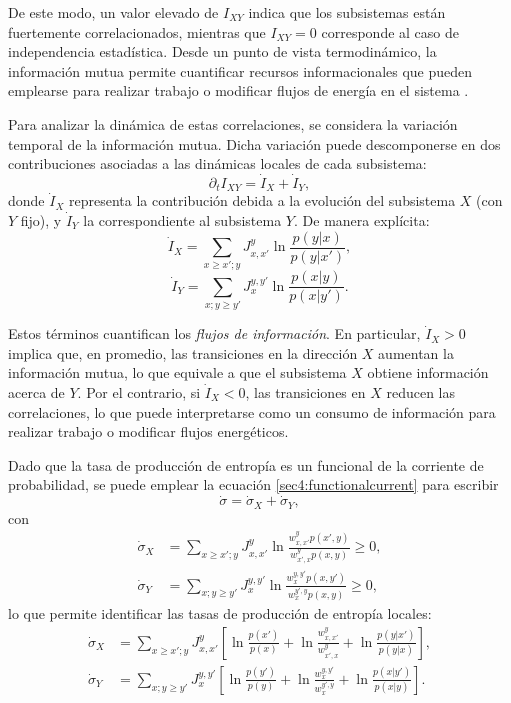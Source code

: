 De este modo, un valor elevado de \( I_{XY} \) indica que los subsistemas están fuertemente correlacionados, mientras que \( I_{XY}=0 \) corresponde al caso de independencia estadística. Desde un punto de vista termodinámico, la información mutua permite cuantificar recursos informacionales que pueden emplearse para realizar trabajo o modificar flujos de energía en el sistema \cite{parrondo2015thermodynamics}.  

Para analizar la dinámica de estas correlaciones, se considera la variación temporal de la información mutua. Dicha variación puede descomponerse en dos contribuciones asociadas a las dinámicas locales de cada subsistema:
\[
\partial_t I_{XY} = \dot{I}_{X} + \dot{I}_{Y},
\]
donde \( \dot{I}_{X} \) representa la contribución debida a la evolución del subsistema \( X \) (con \( Y \) fijo), y \( \dot{I}_{Y} \) la correspondiente al subsistema \( Y \)\cite{horowitz2014thermodynamics}. De manera explícita:
\begin{equation}
    \dot{I}_{X}  = \sum_{x\geq x'; y}J_{x,x'}^{y} \ln \frac{ p(y|x) }{p(y|x')},
    \label{sec4:clasicalflows0}
\end{equation}
\begin{equation}    
    \dot{I}_{Y}  = \sum_{x;y\geq y'} J_{x}^{y,y'} \ln \frac{p(x|y)}{ p(x|y') }.
    \label{sec4:clasicalflows}
\end{equation}

Estos términos cuantifican los \textit{flujos de información}. En particular, \( \dot{I}_{X} > 0 \) implica que, en promedio, las transiciones en la dirección \( X \) aumentan la información mutua, lo que equivale a que el subsistema \( X \) obtiene información acerca de \( Y \). Por el contrario, si \( \dot{I}_{X} < 0 \), las transiciones en \( X \) reducen las correlaciones, lo que puede interpretarse como un consumo de información para realizar trabajo o modificar flujos energéticos.

Dado que la tasa de producción de entropía es un funcional de la corriente de probabilidad, se puede emplear la ecuación \eqref{sec4:functionalcurrent} para escribir
\[
\dot{\sigma} = \dot{\sigma}_{X} + \dot{\sigma}_{Y},
\]
con
\begin{align*}
    \dot{\sigma}_{X} & = \sum_{x \geq x';y} J_{x,x'}^{y} \ln  \frac{w_{x,x'}^{y} p(x',y) }{w_{x',x}^{y} p(x,y) } \geq 0, \\
    \dot{\sigma}_{Y} & = \sum_{x;y\geq y'}J_{x}^{y,y'} \ln \frac{w_{x}^{y,y'} p(x,y') }{ w_{x}^{y',y} p(x,y) } \geq 0,
\end{align*}
lo que permite identificar las tasas de producción de entropía locales:
\begin{align*}
    \dot{\sigma}_{X} &  = \sum_{x \geq x';y} J_{x,x'}^{y} \left[ \ln \frac{p(x')}{p(x)}  +\ln \frac{w_{x,x'}^{y}}{ w_{x',x}^{y} } + \ln \frac{p(y|x')}{p(y|x)} \right], \\
    \dot{\sigma}_{Y} &  = \sum_{x;y \geq y'} J_{x}^{y,y'} \left[ \ln \frac{p(y')}{p(y)}  + \ln \frac{w_{x}^{y,y'}}{ w_{x}^{y',y} } + \ln \frac{p(x|y')}{p(x|y)} \right].
\end{align*}

